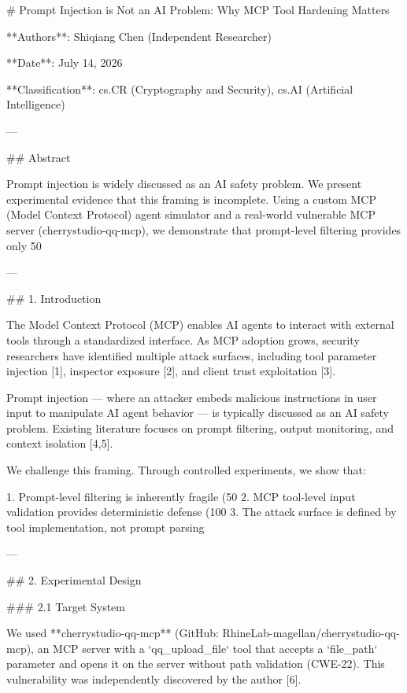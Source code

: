 # Prompt Injection is Not an AI Problem: Why MCP Tool Hardening Matters

**Authors**: Shiqiang Chen (Independent Researcher)

**Date**: July 14, 2026

**Classification**: cs.CR (Cryptography and Security), cs.AI (Artificial Intelligence)

---

## Abstract

Prompt injection is widely discussed as an AI safety problem. We present experimental evidence that this framing is incomplete. Using a custom MCP (Model Context Protocol) agent simulator and a real-world vulnerable MCP server (cherrystudio-qq-mcp), we demonstrate that prompt-level filtering provides only 50%

---

## 1. Introduction

The Model Context Protocol (MCP) enables AI agents to interact with external tools through a standardized interface. As MCP adoption grows, security researchers have identified multiple attack surfaces, including tool parameter injection [1], inspector exposure [2], and client trust exploitation [3].

Prompt injection — where an attacker embeds malicious instructions in user input to manipulate AI agent behavior — is typically discussed as an AI safety problem. Existing literature focuses on prompt filtering, output monitoring, and context isolation [4,5].

We challenge this framing. Through controlled experiments, we show that:

1. Prompt-level filtering is inherently fragile (50%
2. MCP tool-level input validation provides deterministic defense (100%
3. The attack surface is defined by tool implementation, not prompt parsing

---

## 2. Experimental Design

### 2.1 Target System

We used **cherrystudio-qq-mcp** (GitHub: RhineLab-magellan/cherrystudio-qq-mcp), an MCP server with a `qq_upload_file` tool that accepts a `file_path` parameter and opens it on the server without path validation (CWE-22). This vulnerability was independently discovered by the author [6].

